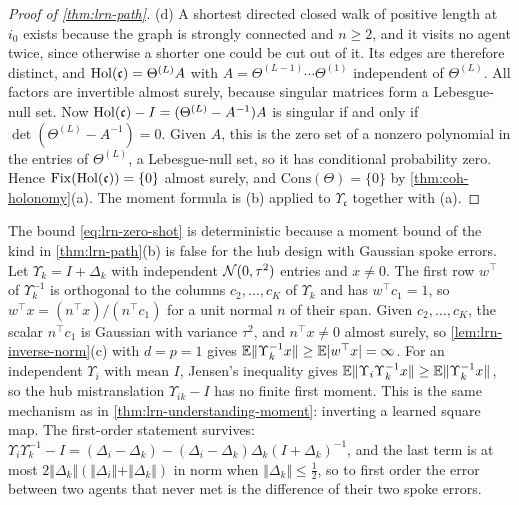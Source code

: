 \begin{proof}[Proof of \cref{thm:lrn-path}]
(d) A shortest directed closed walk of positive length at $i_0$ exists because the graph is strongly connected and $n\ge2$, and it visits no agent twice, since otherwise a shorter one could be cut out of it. Its edges are therefore distinct, and $\operatorname{Hol}(\mathfrak c)=\Theta^{(L)}A$ with $A=\Theta^{(L-1)}\cdots\Theta^{(1)}$ independent of $\Theta^{(L)}$. All factors are invertible almost surely, because singular matrices form a Lebesgue-null set. Now $\operatorname{Hol}(\mathfrak c)-I=(\Theta^{(L)}-A^{-1})A$ is singular if and only if $\det(\Theta^{(L)}-A^{-1})=0$. Given $A$, this is the zero set of a nonzero polynomial in the entries of $\Theta^{(L)}$, a Lebesgue-null set, so it has conditional probability zero. Hence $\mathrm{Fix}(\operatorname{Hol}(\mathfrak c))=\{0\}$ almost surely, and $\mathrm{Cons}(\Theta)=\{0\}$ by \cref{thm:coh-holonomy}(a). The moment formula is (b) applied to $\Upsilon_{\mathfrak c}$ together with (a).
\end{proof}

\begin{remark}\label{rem:lrn-gaussian-spokes}
The bound \cref{eq:lrn-zero-shot} is deterministic because a moment bound of the kind in \cref{thm:lrn-path}(b) is false for the hub design with Gaussian spoke errors. Let $\Upsilon_k=I+\Delta_k$ with independent $\mathcal{N}(0,\tau^2)$ entries and $x\ne0$. The first row $w^\top$ of $\Upsilon_k^{-1}$ is orthogonal to the columns $c_2,\dots,c_K$ of $\Upsilon_k$ and has $w^\top c_1=1$, so $w^\top x=(n^\top x)/(n^\top c_1)$ for a unit normal $n$ of their span. Given $c_2,\dots,c_K$, the scalar $n^\top c_1$ is Gaussian with variance $\tau^2$, and $n^\top x\ne0$ almost surely, so \cref{lem:lrn-inverse-norm}(c) with $d=p=1$ gives $\mathbb{E}\Vert\Upsilon_k^{-1}x\Vert\ge\mathbb{E}|w^\top x|=\infty$. For an independent $\Upsilon_i$ with mean $I$, Jensen's inequality gives $\mathbb{E}\Vert\Upsilon_i\Upsilon_k^{-1}x\Vert\ge\mathbb{E}\Vert\Upsilon_k^{-1}x\Vert$, so the hub mistranslation $\Upsilon_{ik}-I$ has no finite first moment. This is the same mechanism as in \cref{thm:lrn-understanding-moment}: inverting a learned square map. The first-order statement survives: $\Upsilon_i\Upsilon_k^{-1}-I=(\Delta_i-\Delta_k)-(\Delta_i-\Delta_k)\Delta_k(I+\Delta_k)^{-1}$, and the last term is at most $2\Vert\Delta_k\Vert(\Vert\Delta_i\Vert+\Vert\Delta_k\Vert)$ in norm when $\Vert\Delta_k\Vert\le\tfrac12$, so to first order the error between two agents that never met is the difference of their two spoke errors.
\end{remark}

